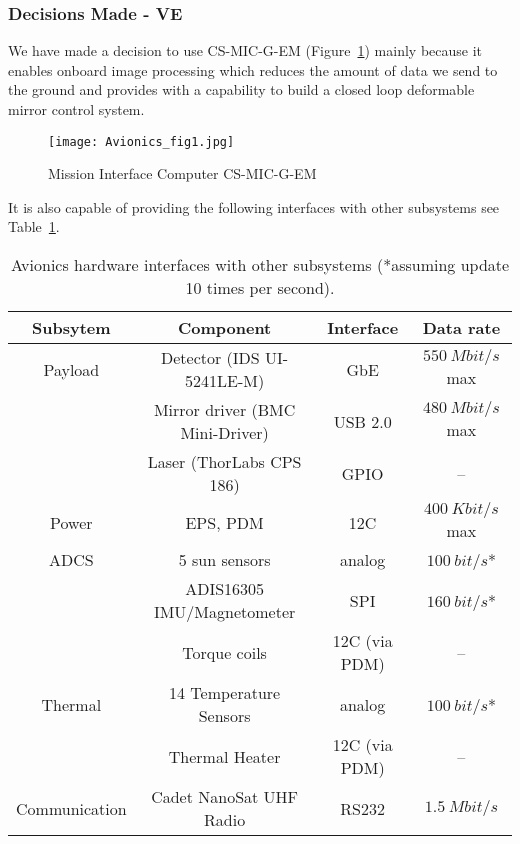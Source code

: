 \documentclass[12pt]{article}
\begin{document}
\subsubsection{Decisions Made - VE}

We have made a decision to use CS-MIC-G-EM (Figure~\ref{fig:avionics_MIC}) mainly because it enables onboard image processing which reduces the amount of data we send to the ground and provides with a capability to build a closed loop deformable mirror control system.

\begin{figure}[ht]
\centering
  \texttt{[image: Avionics\_fig1.jpg]}
\caption{Mission Interface Computer CS-MIC-G-EM \cite{avionics_clyde_space}}
\label{fig:avionics_MIC}
\end{figure}

It is also capable of providing the following interfaces with other subsystems see Table~\ref{table:avionics_interfaces}.

\begin{table}[ht]
\caption{Avionics hardware interfaces with other subsystems (*assuming update 10 times per second).}
\begin{center}
    \begin{tabular}{| c | c | c | c |} \hline
    	Subsytem & Component & Interface & Data rate \\ \hline \hline
    Payload & Detector (IDS UI-5241LE-M) & GbE & $550\ Mbit/s$ max  \\
     & Mirror driver (BMC Mini-Driver) & USB 2.0 & $480\ Mbit/s$ max \\
     & Laser (ThorLabs CPS 186) & GPIO & -- \\ \hline
    Power & EPS, PDM & 12C & $400\ Kbit/s$ max \\ \hline
    ADCS & 5 sun sensors & analog & $100\ bit/s$* \\
     & ADIS16305 IMU/Magnetometer & SPI & $160\ bit/s$* \\
     & Torque coils & 12C (via PDM) & -- \\ \hline
    Thermal & 14 Temperature Sensors & analog & $100\ bit/s$* \\
     & Thermal Heater & 12C (via PDM) & -- \\ \hline
    Communication & Cadet NanoSat UHF Radio & RS232 & $1.5\ Mbit/s$ \\ \hline 
    \end{tabular}
\end{center}
\label{table:avionics_interfaces}
\end{table}
\end{document}
